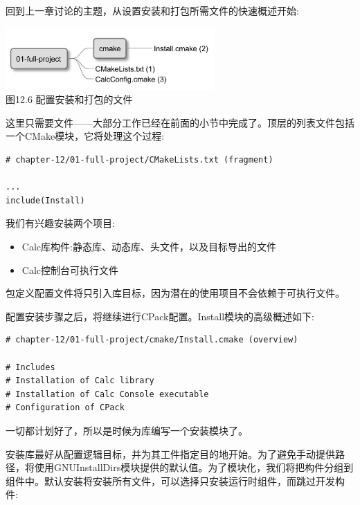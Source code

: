 
回到上一章讨论的主题，从设置安装和打包所需文件的快速概述开始:

\begin{center}
\includegraphics[width=0.6\textwidth]{content/3/chapter12/images/6.jpg}\\
图12.6 配置安装和打包的文件
\end{center}

这里只需要文件——大部分工作已经在前面的小节中完成了。顶层的列表文件包括一个CMake模块，它将处理这个过程:

\begin{lstlisting}[style=styleCMake]
# chapter-12/01-full-project/CMakeLists.txt (fragment)

...
include(Install)
\end{lstlisting}

我们有兴趣安装两个项目:

\begin{itemize}
\item 
Calc库构件:静态库、动态库、头文件，以及目标导出的文件

\item 
Calc控制台可执行文件
\end{itemize}

包定义配置文件将只引入库目标，因为潜在的使用项目不会依赖于可执行文件。

配置安装步骤之后，将继续进行CPack配置。Install模块的高级概述如下:

\begin{lstlisting}[style=styleCMake]
# chapter-12/01-full-project/cmake/Install.cmake (overview)

# Includes
# Installation of Calc library
# Installation of Calc Console executable
# Configuration of CPack
\end{lstlisting}

一切都计划好了，所以是时候为库编写一个安装模块了。


安装库最好从配置逻辑目标，并为其工件指定目的地开始。为了避免手动提供路径，将使用GNUInstallDirs模块提供的默认值。为了模块化，我们将把构件分组到组件中。默认安装将安装所有文件，可以选择只安装运行时组件，而跳过开发构件:

